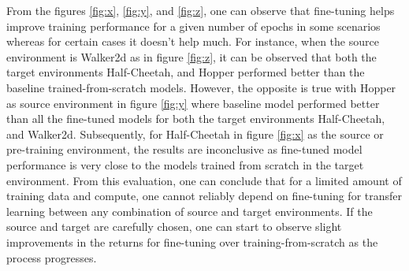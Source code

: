 \documentclass[10pt,a4paper]{article}
\begin{document}
From the figures \ref{fig:x}, \ref{fig:y}, and \ref{fig:z}, one can observe that fine-tuning helps improve training performance 
for a given number of epochs in some scenarios whereas for certain cases it doesn't help much. For instance, when the source 
environment is Walker2d as in figure \ref{fig:z}, it can be observed that both the target environments Half-Cheetah, and Hopper performed 
better than the baseline trained-from-scratch models. However, the opposite is true with Hopper as source environment in figure \ref{fig:y} 
where baseline model performed better than all the fine-tuned models for both the target environments Half-Cheetah, and Walker2d. 
Subsequently, for Half-Cheetah in figure \ref{fig:x} as the source or pre-training environment, the results are inconclusive as fine-tuned 
model performance is very close to the models trained from scratch in the target environment. From this evaluation, one can conclude that 
for a limited amount of training data and compute, one cannot reliably depend on fine-tuning for transfer learning between any combination 
of source and target environments. If the source and target are carefully chosen, one can start to observe slight improvements in the returns 
for fine-tuning over training-from-scratch as the process progresses. 
\end{document}
